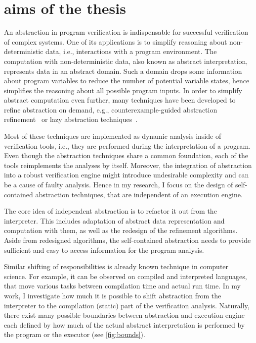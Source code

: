 \chapter{aims of the thesis}
\label{ch:aim}


An abstraction in program verification is indispensable for successful
verification of complex systems. One of its applications is to simplify
reasoning about non-deterministic data, i.e., interactions with a program
environment. The computation with non-de\-ter\-mi\-nistic data, also known as
abstract interpretation, represents data in an abstract domain. Such a domain
drops some information about program variables to reduce the number of
potential variable states, hence simplifies the reasoning about all possible
program inputs. In order to simplify abstract computation even further, many
techniques have been developed to refine abstraction on demand, e.g.,
counterexample-guided abstraction refinement~\cite{Clarke2000} or lazy abstraction
techniques~\cite{Henzinger2002}.

Most of these techniques are implemented as dynamic analysis inside of
verification tools, i.e., they are performed during the interpretation of a
program. Even though the abstraction techniques share a common foundation, each
of the tools reimplements the analyses by itself. Moreover, the integration of
abstraction into a robust verification engine might introduce undesirable
complexity and can be a cause of faulty analysis. Hence in my research, I focus
on the design of self-contained abstraction techniques, that are independent of
an execution engine.

The core idea of independent abstraction is to refactor it out from the
interpreter.  This includes adaptation of abstract data representation and
computation with them, as well as the redesign of the refinement algorithms.
Aside from redesigned algorithms, the self-contained abstraction needs to
provide sufficient and easy to access information for the program analysis.

Similar shifting of responsibilities is already known technique in
computer science. For example, it can be observed on compiled and interpreted
languages, that move various tasks between compilation time and actual run
time. In my work, I investigate how much it is possible to shift abstraction
from the interpreter to the compilation (static) part of the verification
analysis. Naturally, there exist many possible boundaries between abstraction
and execution engine -- each defined by how much of the actual abstract
interpretation is performed by the program or the executor (see
\autoref{fig:bounds}).

